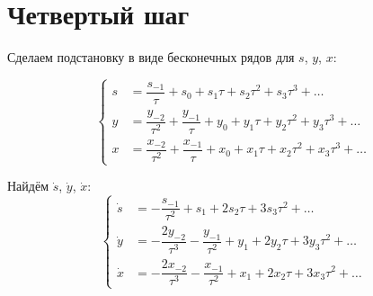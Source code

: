 \section{Четвертый шаг}

Сделаем подстановку в виде бесконечных рядов для $ s $, $ y $, $ x $:

\begin{equation*}
  \left\{
    \begin{aligned}
      s &= \dfrac{s_{-1}}{\tau} + s_0 + s_1\tau + s_2\tau^2 + s_3\tau^3 + \ldots \\
      y &= \dfrac{y_{-2}}{\tau^2} + \dfrac{y_{-1}}{\tau} + y_0 + y_1\tau + y_2\tau^2 + y_3\tau^3 + \ldots \\
      x &= \dfrac{x_{-2}}{\tau^2} + \dfrac{x_{-1}}{\tau} + x_0 + x_1\tau + x_2\tau^2 + x_3\tau^3 + \ldots
    \end{aligned}
  \right.
\end{equation*}

Найдём $ \dot s $, $ \dot y $, $ \dot x $:
\begin{equation*}
	\left\{
		\begin{aligned}
			\dot s &= -\dfrac{s_{-1}}{\tau^{2}} + s_1 + 2s_2\tau + 3s_3\tau^2 + \ldots \\
			\dot y &= -\dfrac{2y_{-2}}{\tau^{3}} - \dfrac{y_{-1}}{\tau^2} + y_1 + 2y_2\tau + 3y_3\tau^2 + \ldots \\
			\dot x &= -\dfrac{2x_{-2}}{\tau^{3}} - \dfrac{x_{-1}}{\tau^2} + x_1 + 2x_2\tau + 3x_3\tau^2 + \ldots
		\end{aligned}
	\right.
\end{equation*}


